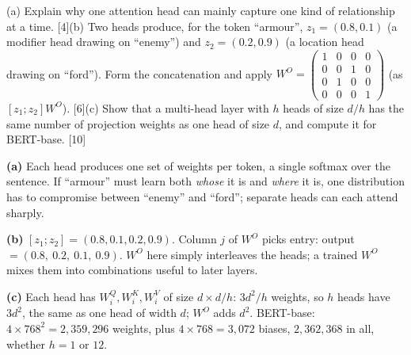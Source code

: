 \documentclass[11pt]{article}
\begin{document}
\begin{prob}(a) Explain why one attention head can mainly capture one kind of relationship at a time. [4]\newline (b) Two heads produce, for the token ``armour'', $z_1=(0.8,0.1)$ (a modifier head drawing on ``enemy'') and $z_2=(0.2,0.9)$ (a location head drawing on ``ford''). Form the concatenation and apply $W^O=\begin{pmatrix}1&0&0&0\\0&0&1&0\\0&1&0&0\\0&0&0&1\end{pmatrix}$ (as $[z_1;z_2]W^O$). [6]\newline (c) Show that a multi-head layer with $h$ heads of size $d/h$ has the same number of projection weights as one head of size $d$, and compute it for BERT-base. [10]\end{prob}

\begin{soln}\textbf{(a)} Each head produces one set of weights per token, a single softmax over the sentence. If ``armour'' must learn both \textit{whose} it is and \textit{where} it is, one distribution has to compromise between ``enemy'' and ``ford''; separate heads can each attend sharply.

\textbf{(b)} $[z_1;z_2]=(0.8,0.1,0.2,0.9)$. Column $j$ of $W^O$ picks entry: output $=(0.8,\ 0.2,\ 0.1,\ 0.9)$. $W^O$ here simply interleaves the heads; a trained $W^O$ mixes them into combinations useful to later layers.

\textbf{(c)} Each head has $W^Q_i,W^K_i,W^V_i$ of size $d\times d/h$: $3d^2/h$ weights, so $h$ heads have $3d^2$, the same as one head of width $d$; $W^O$ adds $d^2$. BERT-base: $4\times768^2=2{,}359{,}296$ weights, plus $4\times768=3{,}072$ biases, $2{,}362{,}368$ in all, whether $h=1$ or $12$.\end{soln}
\end{document}
